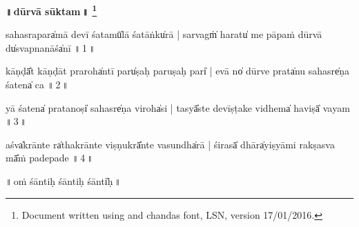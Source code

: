 \documentclass[parskip, DIV=18]{scrartcl}
\renewcommand{\thefootnote}{\fnsymbol{footnote}} %
\begin{document}

\vspace{-1.5cm}

\begin{center}
\textbf{{\Huge ॥\,dūrvā sūktam\,॥} \LARGE\let\thefootnote\relax\footnote{ \color{lightgray} Document written using \XeLaTeX{} and chandas font, LSN, version 17/01/2016.}}
\end{center}
\Large

\centering

\vspace{0.5cm}

sa॒ha॒sra॒para̍mā de॒vī॒ śa॒tamū̍lā śa॒tāṅku̍rā | 
sarvagṁ̍ haratu̍ me
pā॒pa॒ṁ dū॒rvā du̍svapna॒nāśa̍nī ॥\,1\,॥ \par

kāṇḍā̎t kāṇḍāt pra॒roha̍ntī॒ paru̍ṣaḥ paruṣa॒ḥ pari̍ | e॒vā no̍
dūrve॒ prata̍nu sa॒hasre̍ṇa śa॒tena̍ ca ॥\,2\,॥ \par

yā śa॒tena̍ prata॒noṣi̍ sa॒hasre̍ṇa vi॒roha̍si | tasyā̎ste devīṣṭake
vi॒dhema̍ ha॒viṣā̍ va॒yam ॥\,3\,॥ \par

aśva̍krā॒nte ra̍thakrā॒nte॒ vi॒ṣṇukrā̎nte va॒sundha̍rā | śirasā̍
dhāra̍yiṣyā॒mi॒ ra॒kṣa॒sva mā̎ṁ pade॒pade  ॥\,4\,॥ \par

 
\vspace{0.5cm}
 
\begin{center}
 ॥\,oṁ śānti॒ḥ śānti॒ḥ śānti̍ḥ\,॥
\end{center}

\vspace{1.5cm}
\end{document}
